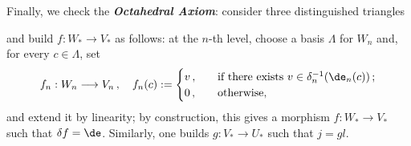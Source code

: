 \begin{ex!}
    Finally, we check the \emph{\textbf{Octahedral Axiom}}:
    consider three distinguished triangles
        \begin{center}
        \end{center}
    and build $f:W_{*} \to V_{*}$ as follows: at the $n$-th level,
    choose a basis $\Lambda$ for $W_{n}$ and,
    for every $c \in \Lambda$, set
    \begin{equation*}
        f_{n} : W_{n} \longrightarrow V_{n}\,, \quad
        f_{n}(c) := 
        \begin{cases}
            v\,, \quad
            &\text{if there exists } v \in \delta_{n}^{-1}(\de_{n}(c))\,; \\
            0\,, \quad &\text{otherwise},
        \end{cases}
    \end{equation*}
    and extend it by linearity; by construction,
    this gives a morphism $f:W_{*} \to V_{*}$ such that
    $\delta f = \de$. Similarly, one builds $g:V_{*} \to U_{*}$
    such that $j=gl$.
\end{ex!}

